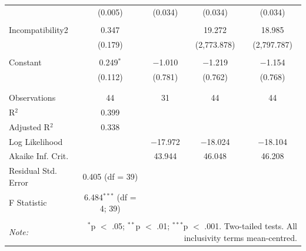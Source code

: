 \begin{table}[!htbp]
\begin{tabular}{@{\extracolsep{5pt}}lcccc}
  & (0.005) & (0.034) & (0.034) & (0.034) \\ 
  & & & & \\ 
 Incompatibility2 & 0.347 &  & 19.272 & 18.985 \\ 
  & (0.179) &  & (2,773.878) & (2,797.787) \\ 
  & & & & \\ 
 Constant & 0.249$^{*}$ & $-$1.010 & $-$1.219 & $-$1.154 \\ 
  & (0.112) & (0.781) & (0.762) & (0.768) \\ 
  & & & & \\ 
\hline \\[-1.8ex] 
Observations & 44 & 31 & 44 & 44 \\ 
R$^{2}$ & 0.399 &  &  &  \\ 
Adjusted R$^{2}$ & 0.338 &  &  &  \\ 
Log Likelihood &  & $-$17.972 & $-$18.024 & $-$18.104 \\ 
Akaike Inf. Crit. &  & 43.944 & 46.048 & 46.208 \\ 
Residual Std. Error & 0.405 (df = 39) &  &  &  \\ 
F Statistic & 6.484$^{***}$ (df = 4; 39) &  &  &  \\ 
\hline 
\hline \\[-1.8ex] 
\textit{Note:}  & \multicolumn{4}{r}{$^{*}$p $<$ .05; $^{**}$p $<$ .01; $^{***}$p $<$ .001. Two-tailed tests. All inclusivity terms mean-centred.} \\ 
\end{tabular} 
\end{table} 
